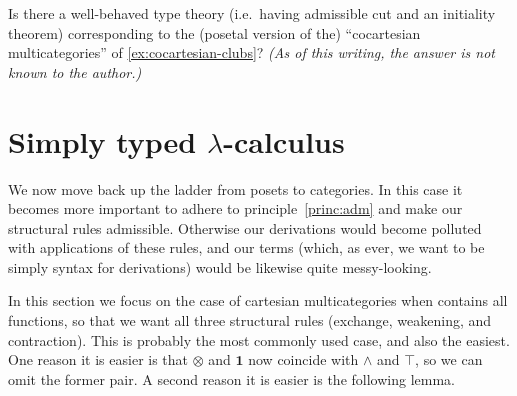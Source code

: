 \documentclass{book}
\let\meet\wedge
\def\one{\mathbf{1}}
\let\tensor\otimes
\begin{document}
\begin{ex}\label{ex:cocartesian-typetheory}
  Is there a well-behaved type theory (i.e.\ having admissible cut and an initiality theorem) corresponding to the (posetal version of the) ``cocartesian multicategories'' of \cref{ex:cocartesian-clubs}?
  \textit{(As of this writing, the answer is not known to the author.)}
\end{ex}



\section{Simply typed $\lambda$-calculus}
\label{sec:stlc}
\label{sec:cartmoncat}

We now move back up the ladder from posets to categories.
In this case it becomes more important to adhere to principle~\eqref{princ:adm} and make our structural rules admissible.
Otherwise our derivations would become polluted with applications of these rules, and our terms (which, as ever, we want to be simply syntax for derivations) would be likewise quite messy-looking.

In this section we focus on the case of cartesian multicategories when \fS contains all functions, so that we want all three structural rules (exchange, weakening, and contraction).
This is probably the most commonly used case, and also the easiest.
One reason it is easier is that $\tensor$ and $\one$ now coincide with $\meet$ and $\top$, so we can omit the former pair.
A second reason it is easier is the following lemma.
\end{document}
